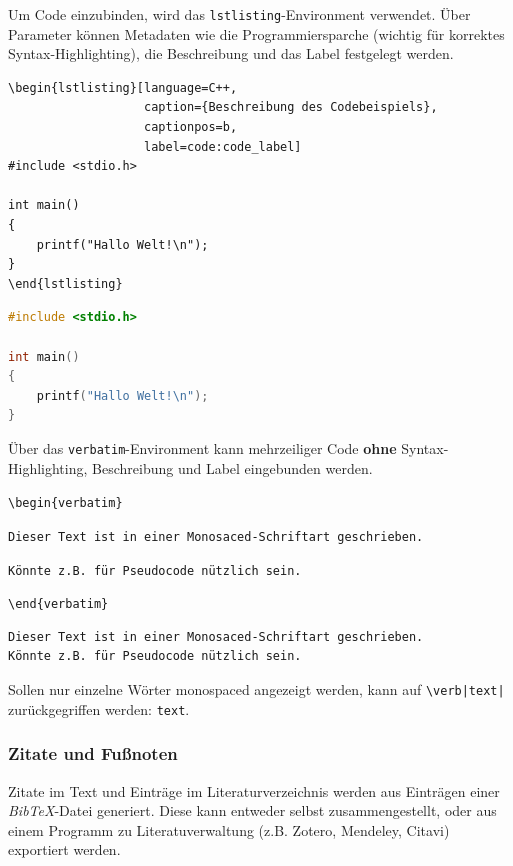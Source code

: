
Um Code einzubinden, wird das \verb|lstlisting|-Environment verwendet.
Über Parameter können Metadaten wie die Programmiersparche (wichtig für korrektes Syntax-Highlighting), die Beschreibung und das Label festgelegt werden.

\begin{verbatim}
\begin{lstlisting}[language=C++,
                   caption={Beschreibung des Codebeispiels},
                   captionpos=b,
                   label=code:code_label]
#include <stdio.h>

int main()
{
    printf("Hallo Welt!\n");
}
\end{lstlisting}
\end{verbatim}

\begin{lstlisting}[language=C++,
                   caption={Beschreibung des Codebeispiels},
                   captionpos=b,
                   label=code:code_label]
#include <stdio.h>

int main()
{
    printf("Hallo Welt!\n");
}
\end{lstlisting}

Über das \verb|verbatim|-Environment kann mehrzeiliger Code \textbf{ohne} Syntax-Highlighting, Beschreibung und Label eingebunden werden.

\verb|\begin{verbatim}|

\verb|Dieser Text ist in einer Monosaced-Schriftart geschrieben.|

\verb|Könnte z.B. für Pseudocode nützlich sein.|

\verb|\end{verbatim}|

\begin{verbatim}
Dieser Text ist in einer Monosaced-Schriftart geschrieben.
Könnte z.B. für Pseudocode nützlich sein.
\end{verbatim}

Sollen nur einzelne Wörter monospaced angezeigt werden, kann auf \verb!\verb|text|! zurückgegriffen werden: \verb|text|.

\subsubsection{Zitate und Fußnoten}


Zitate im Text und Einträge im Literaturverzeichnis werden aus Einträgen einer \emph{BibTeX}-Datei generiert.
Diese kann entweder selbst zusammengestellt, oder aus einem Programm zu Literatuverwaltung (z.B. Zotero, Mendeley, Citavi) exportiert werden.

